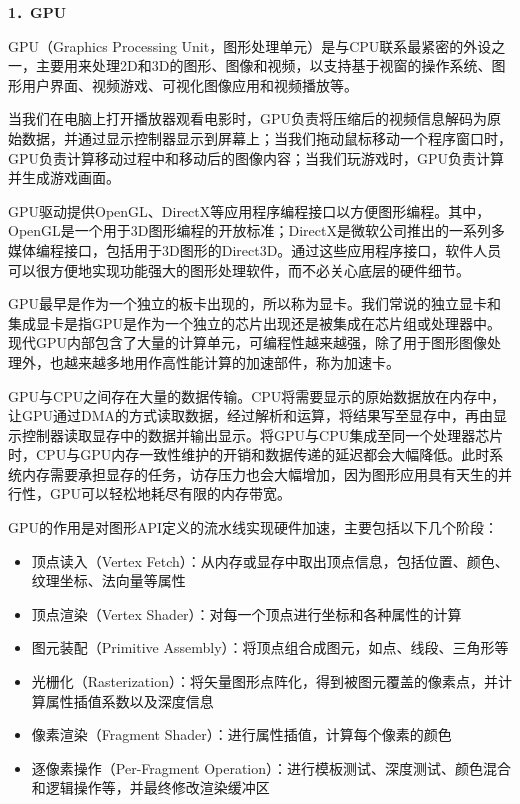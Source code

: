 \documentclass[]{ctexbook}
\begin{document}
\textbf{1．GPU}

GPU（Graphics Processing Unit，图形处理单元）是与CPU联系最紧密的外设之一，主要用来处理2D和3D的图形、图像和视频，以支持基于视窗的操作系统、图形用户界面、视频游戏、可视化图像应用和视频播放等。

当我们在电脑上打开播放器观看电影时，GPU负责将压缩后的视频信息解码为原始数据，并通过显示控制器显示到屏幕上；当我们拖动鼠标移动一个程序窗口时，GPU负责计算移动过程中和移动后的图像内容；当我们玩游戏时，GPU负责计算并生成游戏画面。

GPU驱动提供OpenGL、DirectX等应用程序编程接口以方便图形编程。其中，OpenGL是一个用于3D图形编程的开放标准；DirectX是微软公司推出的一系列多媒体编程接口，包括用于3D图形的Direct3D。通过这些应用程序接口，软件人员可以很方便地实现功能强大的图形处理软件，而不必关心底层的硬件细节。

GPU最早是作为一个独立的板卡出现的，所以称为显卡。我们常说的独立显卡和集成显卡是指GPU是作为一个独立的芯片出现还是被集成在芯片组或处理器中。现代GPU内部包含了大量的计算单元，可编程性越来越强，除了用于图形图像处理外，也越来越多地用作高性能计算的加速部件，称为加速卡。

GPU与CPU之间存在大量的数据传输。CPU将需要显示的原始数据放在内存中，让GPU通过DMA的方式读取数据，经过解析和运算，将结果写至显存中，再由显示控制器读取显存中的数据并输出显示。将GPU与CPU集成至同一个处理器芯片时，CPU与GPU内存一致性维护的开销和数据传递的延迟都会大幅降低。此时系统内存需要承担显存的任务，访存压力也会大幅增加，因为图形应用具有天生的并行性，GPU可以轻松地耗尽有限的内存带宽。

GPU的作用是对图形API定义的流水线实现硬件加速，主要包括以下几个阶段：

\begin{itemize}
\item
  顶点读入（Vertex Fetch）：从内存或显存中取出顶点信息，包括位置、颜色、纹理坐标、法向量等属性
\item
  顶点渲染（Vertex Shader）：对每一个顶点进行坐标和各种属性的计算
\item
  图元装配（Primitive Assembly）：将顶点组合成图元，如点、线段、三角形等
\item
  光栅化（Rasterization）：将矢量图形点阵化，得到被图元覆盖的像素点，并计算属性插值系数以及深度信息
\item
  像素渲染（Fragment Shader）：进行属性插值，计算每个像素的颜色
\item
  逐像素操作（Per-Fragment Operation）：进行模板测试、深度测试、颜色混合和逻辑操作等，并最终修改渲染缓冲区
\end{itemize}
\end{document}
